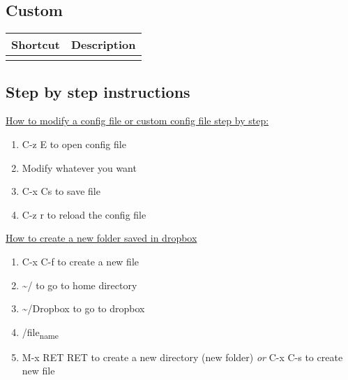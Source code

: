 \documentclass[11pt]{article}
\begin{document}
\subsection{Custom}
\label{sec:org99c0552}
\begin{center}
\begin{tabular}{ll}
\hline
Shortcut & Description\\
\hline
 & \\
\hline
\end{tabular}
\end{center}
\subsection{Step by step instructions}
\label{sec:org69c401a}
\uline{How to modify a config file or custom config file step by step:}
\begin{enumerate}
\item C-z E to open config file
\item Modify whatever you want
\item C-x Cs to save file
\item C-z r to reload the config file
\end{enumerate}
\uline{How to create a new folder saved in dropbox}
\begin{enumerate}
\item C-x C-f to create a new file
\item \textasciitilde{}/ to go to home directory
\item \textasciitilde{}/Dropbox to go to dropbox
\item /file\textsubscript{name}
\item M-x RET RET to create a new directory (new folder) \emph{or} C-x C-s to create new file
\end{enumerate}
\end{document}
